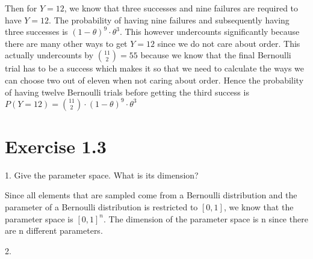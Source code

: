 \documentclass[a4paper,11pt]{article}
\newcommand{\1}[1]{\,I_{#1}} %
\begin{document}
Then for $Y=12$, we know that three successes and nine failures are required to have $Y = 12$. The probability of having nine failures and subsequently having three successes is $(1-\theta)^9 \cdot \theta^3$. This however undercounts significantly because there are many other ways to get $Y=12$ since we do not care about order. This actually undercounts by $\binom{11}{2} = 55$ because we know that the final Bernoulli trial has to be a success which makes it so that we need to calculate the ways we can choose two out of eleven when not caring about order. Hence the probability of having twelve Bernoulli trials before getting the third success is $P(Y = 12) = \binom{11}{2} \cdot (1-\theta)^9 \cdot \theta^3$


\section{Exercise 1.3}

1. Give the parameter space. What is its dimension?

Since all elements that are sampled come from a Bernoulli distribution and the parameter of a Bernoulli distribution is restricted to $[0,1]$, we know that the parameter space is $[0, 1]^n$. The dimension of the parameter space is n since there are n different parameters. %

2. 
\end{document}
